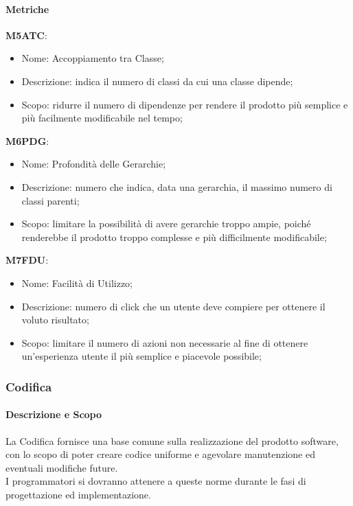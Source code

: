     \paragraph{Metriche} \hfill \break
    \textbf{M5ATC}:
    \begin{itemize}
      \item Nome: Accoppiamento tra Classe;
      \item Descrizione: indica il numero di classi da cui una classe dipende;
      \item Scopo: ridurre il numero di dipendenze per rendere il prodotto più semplice e più facilmente modificabile nel tempo;
    \end{itemize}
    \textbf{M6PDG}:
    \begin{itemize}
      \item Nome: Profondità delle Gerarchie;
      \item Descrizione: numero che indica, data una gerarchia, il massimo numero di classi parenti;
      \item Scopo: limitare la possibilità di avere gerarchie troppo ampie, poiché renderebbe il prodotto troppo complesse e più difficilmente modificabile;
    \end{itemize}
    \textbf{M7FDU}:
    \begin{itemize}
      \item Nome: Facilità di Utilizzo;
      \item Descrizione: numero di click che un utente deve compiere per ottenere il voluto risultato;
      \item Scopo: limitare il numero di azioni non necessarie al fine di ottenere un'esperienza utente il più semplice e piacevole possibile;
    \end{itemize}

	\subsubsection{Codifica} 
		\paragraph{Descrizione e Scopo} \hfill \break
		La Codifica fornisce una base comune sulla realizzazione del prodotto software, con lo scopo di poter creare codice uniforme e agevolare manutenzione ed eventuali modifiche future. \\
		I programmatori si dovranno attenere a queste norme durante le fasi di progettazione ed implementazione. 
			
